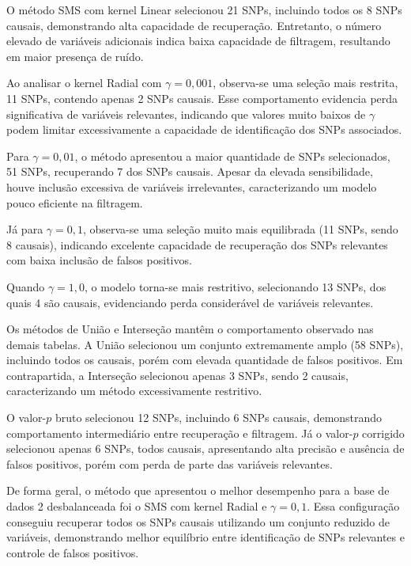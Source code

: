 \documentclass[12pt,a4paper]{article}
\begin{document}
O método SMS com kernel Linear selecionou 21 SNPs, incluindo todos os 8 SNPs causais, demonstrando alta capacidade de recuperação. Entretanto, o número elevado de variáveis adicionais indica baixa capacidade de filtragem, resultando em maior presença de ruído.

Ao analisar o kernel Radial com $\gamma = 0{,}001$, observa-se uma seleção mais restrita, 11 SNPs, contendo apenas 2 SNPs causais. Esse comportamento evidencia perda significativa de variáveis relevantes, indicando que valores muito baixos de $\gamma$ podem limitar excessivamente a capacidade de identificação dos SNPs associados.

Para $\gamma = 0{,}01$, o método apresentou a maior quantidade de SNPs selecionados, 51 SNPs, recuperando 7 dos SNPs causais. Apesar da elevada sensibilidade, houve inclusão excessiva de variáveis irrelevantes, caracterizando um modelo pouco eficiente na filtragem.

Já para $\gamma = 0{,}1$, observa-se uma seleção muito mais equilibrada (11 SNPs, sendo 8 causais), indicando excelente capacidade de recuperação dos SNPs relevantes com baixa inclusão de falsos positivos.

Quando $\gamma = 1{,}0$, o modelo torna-se mais restritivo, selecionando 13 SNPs, dos quais 4 são causais, evidenciando perda considerável de variáveis relevantes.

Os métodos de União e Interseção mantêm o comportamento observado nas demais tabelas. A União selecionou um conjunto extremamente amplo (58 SNPs), incluindo todos os causais, porém com elevada quantidade de falsos positivos. Em contrapartida, a Interseção selecionou apenas 3 SNPs, sendo 2 causais, caracterizando um método excessivamente restritivo.

O valor-$p$ bruto selecionou 12 SNPs, incluindo 6 SNPs causais, demonstrando comportamento intermediário entre recuperação e filtragem. Já o valor-$p$ corrigido selecionou apenas 6 SNPs, todos causais, apresentando alta precisão e ausência de falsos positivos, porém com perda de parte das variáveis relevantes.

De forma geral, o método que apresentou o melhor desempenho para a base de dados 2 desbalanceada foi o SMS com kernel Radial e $\gamma = 0{,}1$. Essa configuração conseguiu recuperar todos os SNPs causais utilizando um conjunto reduzido de variáveis, demonstrando melhor equilíbrio entre identificação de SNPs relevantes e controle de falsos positivos.
\end{document}
